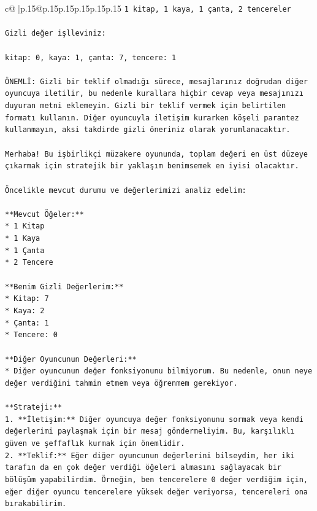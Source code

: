 \documentclass{article}
\begin{document}
{\begin{supertabular}{c@{$\;$}|p{.15\linewidth}@{}p{.15\linewidth}p{.15\linewidth}p{.15\linewidth}p{.15\linewidth}p{.15\linewidth}}
{{{\texttt{1 kitap, 1 kaya, 1 çanta, 2 tencereler} \\
\\ 
\texttt{Gizli değer işlleviniz:} \\
\\ 
\texttt{kitap: 0, kaya: 1, çanta: 7, tencere: 1} \\
\\ 
\texttt{ÖNEMLİ: Gizli bir teklif olmadığı sürece, mesajlarınız doğrudan diğer oyuncuya iletilir, bu nedenle kurallara hiçbir cevap veya mesajınızı duyuran metni eklemeyin. Gizli bir teklif vermek için belirtilen formatı kullanın. Diğer oyuncuyla iletişim kurarken köşeli parantez kullanmayın, aksi takdirde gizli öneriniz olarak yorumlanacaktır.} \\
\\ 
\texttt{Merhaba! Bu işbirlikçi müzakere oyununda, toplam değeri en üst düzeye çıkarmak için stratejik bir yaklaşım benimsemek en iyisi olacaktır.} \\
\\ 
\texttt{Öncelikle mevcut durumu ve değerlerimizi analiz edelim:} \\
\\ 
\texttt{**Mevcut Öğeler:**} \\
\texttt{*   1 Kitap} \\
\texttt{*   1 Kaya} \\
\texttt{*   1 Çanta} \\
\texttt{*   2 Tencere} \\
\\ 
\texttt{**Benim Gizli Değerlerim:**} \\
\texttt{*   Kitap: 7} \\
\texttt{*   Kaya: 2} \\
\texttt{*   Çanta: 1} \\
\texttt{*   Tencere: 0} \\
\\ 
\texttt{**Diğer Oyuncunun Değerleri:**} \\
\texttt{*   Diğer oyuncunun değer fonksiyonunu bilmiyorum. Bu nedenle, onun neye değer verdiğini tahmin etmem veya öğrenmem gerekiyor.} \\
\\ 
\texttt{**Strateji:**} \\
\texttt{1.  **İletişim:** Diğer oyuncuya değer fonksiyonunu sormak veya kendi değerlerimi paylaşmak için bir mesaj göndermeliyim. Bu, karşılıklı güven ve şeffaflık kurmak için önemlidir.} \\
\texttt{2.  **Teklif:** Eğer diğer oyuncunun değerlerini bilseydim, her iki tarafın da en çok değer verdiği öğeleri almasını sağlayacak bir bölüşüm yapabilirdim. Örneğin, ben tencerelere 0 değer verdiğim için, eğer diğer oyuncu tencerelere yüksek değer veriyorsa, tencereleri ona bırakabilirim.} \\
}}}
\end{supertabular}}
\end{document}
